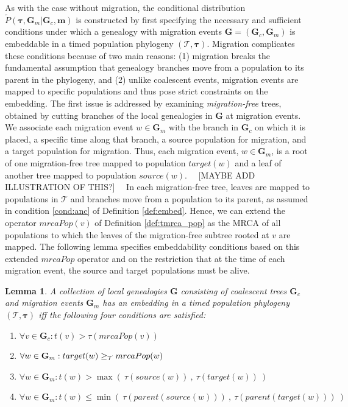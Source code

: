 \documentclass[11pt]{article}
\newcommand{\vect}[1]{\boldsymbol{\mathbf{#1}}}
\newcommand{\Tr}{\mathcal{T}}
\newcommand{\G}{\vect{G}}
\newcommand{\Pref}{\widetilde{P}}
\newcommand{\1}{\mathbbm{1}}
\newcommand{\Gc}{\G_c}
\newcommand{\Gm}{\G_m}
\newtheorem{lemma}{Lemma}
\newcommand{\taus}{\vect\tau}
\newcommand{\migs}{\vect{m}}
\begin{document}
As with the case without migration, the conditional distribution $\Pref(\taus,\Gm|\Gc,\migs)$ is constructed by first specifying the necessary and sufficient conditions
under which a genealogy with migration events $\G=(\Gc,\Gm)$ is embeddable in a timed population phylogeny $(\Tr,\taus)$.
%
Migration complicates these conditions because of two main reasons:
(1) migration breaks the fundamental assumption that genealogy branches move from a population to its parent in the phylogeny,
and (2) unlike coalescent events, migration events are mapped to specific populations and thus pose strict constraints on the embedding.
%
The first issue is addressed by examining \emph{migration-free} trees, obtained by cutting branches of the local genealogies in $\G$ at migration events.
%
We associate each migration event  $w\in\Gm$ with the branch in $\Gc$ on which it is placed, a specific time along that branch, a source population for migration, and a target population for migration.
%
Thus, each migration event, $w\in\Gm$, is a root of one migration-free tree mapped to population $target(w)$ and a leaf of another tree mapped to population $source(w)$.
~~[MAYBE ADD ILLUSTRATION OF THIS?]~~
%
In each migration-free tree, leaves are mapped to populations in $\Tr$ and branches move from a population to its parent, as assumed in condition \ref{cond:anc} of Definition \ref{def:embed}.
Hence, we can extend the operator $mrcaPop(v)$ of Definition \ref{def:tmrca_pop} as the MRCA of all populations to which the leaves of the migration-free subtree rooted at $v$ are mapped.
%
The following lemma specifies embeddability conditions based on this extended $mrcaPop$ operator and on the restriction that at the time of each migration event,
the source and target populations must be alive.


\begin{lemma}\label{lem:embed_mig}
 A collection of local genealogies $\G$  consisting of coalescent trees $\Gc$ and migration events $\Gm$ has an embedding in a timed population phylogeny $(\Tr,\taus)$ iff
 the following four conditions are satisfied:
 \begin{enumerate}
  \item \label{cond:ub_coal}  $\forall v\in \Gc: t(v) > \tau(mrcaPop(v))$
  \item \label{cond:mrca_mig} $\forall w\in\Gm: target(w)\anc mrcaPop(w)$
  \item \label{cond:ub_mig}   $\forall w\in\Gm: t(w) > \max(~\tau(source(w))~,~\tau(target(w))~)$
  \item \label{cond:lb_mig}   $\forall w\in\Gm: t(w) \leq \min(~\tau(parent(source(w)))~,~\tau(parent(target(w)))~)$
 \end{enumerate}
\end{lemma}
\end{document}
